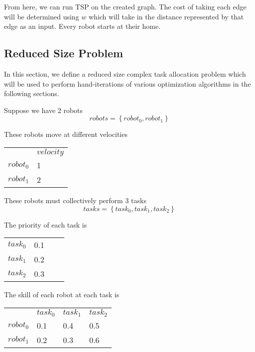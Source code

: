 \documentclass[a4paper]{article}
\begin{document}
From here, we can run TSP on the created graph. The cost of taking each edge will be determined using $w$ which will take in the distance represented by that edge as an input. Every robot starts at their home.

\subsection{Reduced Size Problem}



In this section, we define a reduced size complex task allocation problem which
will be used to perform hand-iterations of various optimization algorithms in
the following sections.

Suppose we have 2 robots
$$\mathit{robots} = \left\{ \mathit{robot}_0, \mathit{robot}_1 \right\}$$

These robots move at different velocities

\begin{tabular}{ll}
                   & $\mathit{velocity}$ \\
$\mathit{robot}_0$ & 1 \\
$\mathit{robot}_1$ & 2 \\
\end{tabular}
\vspace{1.5em}

These robots must collectively perform 3 tasks
$$\mathit{tasks} = \left\{ \mathit{task}_0, \mathit{task}_1,  \mathit{task}_2 \right\}$$

The priority of each task is

\begin{tabular}{llll}
$\mathit{task}_0$  & 0.1 \\
$\mathit{task}_1$  & 0.2 \\
$\mathit{task}_2$  & 0.3 \\
\end{tabular}
\vspace{1.5em}

The skill of each robot  at each task is

\begin{tabular}{llll}
                   & $\mathit{task}_0$ & $\mathit{task}_1$ & $\mathit{task}_2$ \\
$\mathit{robot}_0$ & 0.1               & 0.4               & 0.5               \\
$\mathit{robot}_1$ & 0.2               & 0.3               & 0.6               \\
\end{tabular}
\vspace{1.5em}
\end{document}
